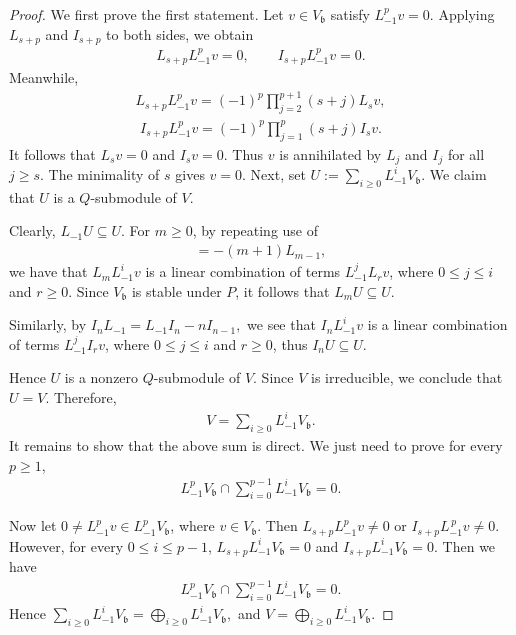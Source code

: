 \documentclass[a4paper]{amsart}
\numberwithin{equation}{section}
\begin{document}
\begin{proof}
We first prove the first statement. Let $v\in V_{\mathfrak{b}}$ satisfy $L_{-1}^pv=0.$
    Applying $L_{s+p}$ and $I_{s+p}$ to both sides, we obtain
    \begin{align*}
    L_{s+p}L_{-1}^pv=0,\qquad I_{s+p}L_{-1}^pv=0.
    \end{align*}
Meanwhile,
    \begin{align*}
    L_{s+p}L_{-1}^pv
    =
    (-1)^p\prod_{j=2}^{p+1}(s+j)L_sv,
    \end{align*}
    \begin{align*}
    I_{s+p}L_{-1}^pv
    =
    (-1)^p\prod_{j=1}^{p}(s+j)I_sv.
    \end{align*}
    It follows that
    $L_sv=0$ and $I_sv=0$.
Thus $v$ is annihilated by $L_j$ and $I_j$ for all $j\geq s$. The minimality of $s$ gives $v=0$.
Next, set $U:=\sum_{i\geq 0}L_{-1}^iV_{\mathfrak{b}}$.
We claim that $U$ is a $Q$-submodule of $V$.

Clearly, $L_{-1}U\subseteq U$. For $m\geq 0$, by repeating use of
\begin{align*}
[L_m,L_{-1}]=-(m+1)L_{m-1},
\end{align*}
we have that $L_mL_{-1}^iv$ is a linear combination of terms $L_{-1}^jL_rv$, where
$0\leq j\leq i$ and $r\geq 0$. Since $V_{\mathfrak{b}}$ is stable under $P$, it follows that $L_mU\subseteq U$.

Similarly, by
$
I_nL_{-1}=L_{-1}I_n-nI_{n-1},
$
we see that $I_nL_{-1}^iv$ is a linear combination of terms $L_{-1}^jI_rv$, where
$0\leq j\leq i$ and $r\geq 0$, thus $I_nU\subseteq U$.

Hence $U$ is a nonzero $Q$-submodule of $V$. Since $V$ is irreducible, we conclude that $U=V$. Therefore,
\begin{align*}
V=\sum_{i\geq 0}L_{-1}^iV_{\mathfrak{b}}.
\end{align*}
It remains to show that the above sum is direct. We just need to prove for every $p\geq 1$,
\begin{align*}
L_{-1}^{p}V_{\mathfrak{b}}\cap \sum_{i=0}^{p-1}L_{-1}^iV_{\mathfrak{b}}=0.
\end{align*}

Now let $0\neq L_{-1}^{p}v\in L_{-1}^{p}V_{\mathfrak{b}}$, where $v\in V_{\mathfrak{b}}$. Then
$
L_{s+p}L_{-1}^{p}v\neq 0
$ or
$
I_{s+p}L_{-1}^{\,p}v
\neq 0.
$
However, for every $0\leq i\leq p-1$,
$
L_{s+p}L_{-1}^{i}V_{\mathfrak{b}}=0$
and
$I_{s+p}L_{-1}^{i}V_{\mathfrak{b}}=0.$
Then we have
\begin{align*}
L_{-1}^{p}V_{\mathfrak{b}}\cap \sum_{i=0}^{p-1}L_{-1}^{i}V_{\mathfrak{b}}=0.
\end{align*}
Hence
$
\sum_{i\geq 0}L_{-1}^{i}V_{\mathfrak{b}}
=
\bigoplus_{i\geq 0}L_{-1}^{i}V_{\mathfrak{b}},
$
and 
$
V=\bigoplus_{i\geq 0}L_{-1}^{i}V_{\mathfrak{b}}.
$
\end{proof}
\end{document}
